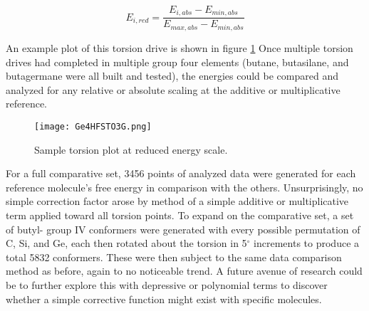 \begin{equation}
E_{i, red} = \frac{E_{i,abs} - E_{min,abs}}{E_{max,abs}-E_{min,abs}}
\label{eq:TorsionReducedScale}
\end{equation}

An example plot of this torsion drive is shown in figure \ref{fig:EXTorsion} Once multiple torsion drives had completed in multiple group four elements (butane, butasilane, and butagermane were all built and tested), the energies could be compared and analyzed for any relative or absolute scaling at the additive or multiplicative reference. 

\begin{figure}
	
	\centering
	
	\texttt{[image: Ge4HFSTO3G.png]}
	
	\caption{Sample torsion plot at reduced energy scale.}
	
	\label{fig:EXTorsion}
	
\end{figure}

For a full comparative set, 3456 points of analyzed data were generated for each reference molecule's free energy in comparison with the others. 
Unsurprisingly, no simple correction factor arose by method of a simple additive or multiplicative term applied toward all torsion points. 
To expand on the comparative set, a set of butyl- group IV conformers were generated with every possible permutation of C, Si, and Ge, each then rotated about the torsion in 5$^{\circ}$ increments to produce a total 5832 conformers.
These were then subject to the same data comparison method as before, again to no noticeable trend.
A future avenue of research could be to further explore this with depressive or polynomial terms to discover whether a simple corrective function might exist with specific molecules.

